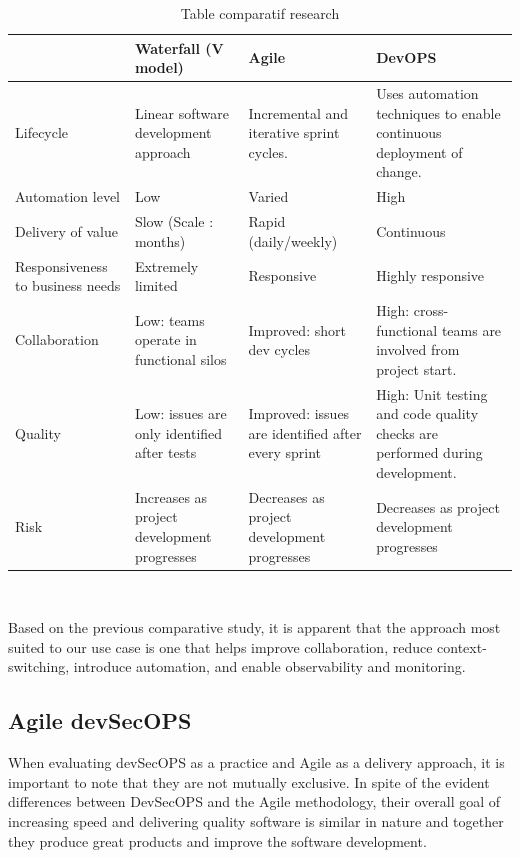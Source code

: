 \begin{table}[h!]
\center
\begin{tabular}[b]{|m{3cm}|m{4cm}|m{4cm}|m{4cm}|}
\hline
\rowcolor{white}
 & Waterfall (V model) 
 & Agile   & DevOPS  \\
\hline
 Lifecycle  
& Linear software development approach 
& Incremental and iterative sprint cycles. 
& Uses automation techniques to enable continuous deployment of change. \\
\hline
 Automation level  
& Low 
& Varied 
& High 
 \\
\hline
 Delivery of value 
& Slow (Scale : months) 
& Rapid (daily/weekly) 
& Continuous  \\
\hline
 Responsiveness to business needs 
& Extremely limited 
& Responsive 
& Highly responsive   \\
\hline
 Collaboration 
& Low: teams operate in functional silos 
& Improved: short dev cycles 
& High: cross-functional teams are involved from project start. \\
\hline
Quality 
& Low: issues are only identified after tests 
& Improved: issues are identified after every sprint 
& High: Unit testing and code quality checks are performed during development. \\
\hline
 Risk 
& Increases as project development progresses 
& Decreases as project development progresses 
& Decreases as project development progresses \\
\hline
\end{tabular}
\caption{Table comparatif research}
\textcolor{white}{I} \label{tab:tab-m}
\end{table}

Based on the previous comparative study, it is apparent that the approach most suited to our use case is one that helps improve collaboration, reduce context-switching, introduce automation, and enable observability and monitoring. 

\subsection{Agile devSecOPS }

When evaluating devSecOPS as a practice and Agile as a delivery approach, it is important to note that they are not mutually exclusive. In spite of the evident differences between DevSecOPS and the Agile methodology, their overall goal of increasing speed and delivering quality software is similar in nature and together they produce great products and improve the software development. 


